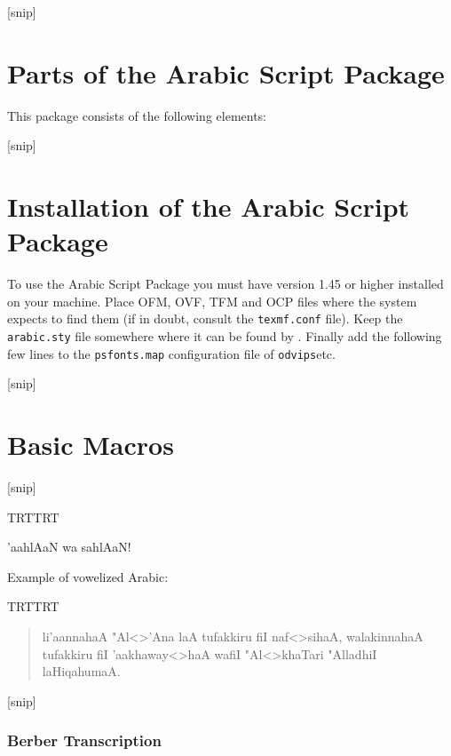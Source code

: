 \documentclass[a4paper,11pt]{article}
\begin{document}
[snip] 


\section{Parts of the \OMEGA{} Arabic Script Package}

This package consists of the following elements:


[snip] 


\section{Installation of the \OMEGA{} Arabic Script Package}

To use the \OMEGA{} Arabic Script Package you must have \OMEGA{}
version 1.45 or higher installed on your machine. Place OFM, OVF, TFM
and OCP files where the system expects to find them (if in doubt,
consult the \texttt{texmf.conf} file). Keep the \texttt{arabic.sty}
file somewhere where it can be found by \OMEGA{}. Finally add the
following few lines to the \texttt{psfonts.map} configuration file of
\texttt{odvips}etc.


[snip] 


\section{Basic Macros}


[snip] 


{\pardir TRT\textdir TRT
\begin{center}
\begin{arab}
\Huge
'aahlAaN wa sahlAaN!
\end{arab}
\end{center}
}

\noindent
Example of vowelized Arabic:\\[8pt]

{\pardir TRT\textdir TRT
\begin{quote}
\pushocplist\ArabicOCP{}\selectfont\LARGE li'aannahaA
"Al<>'Ana laA tufakkiru fiI naf<>sihaA, walakinnahaA tufakkiru fiI
'aakhaway<>haA wafiI "Al<>khaTari "AlladhiI laHiqahumaA.  \popocplist
\end{quote}
}


[snip] 


\subsubsection{Berber Transcription}
\end{document}
